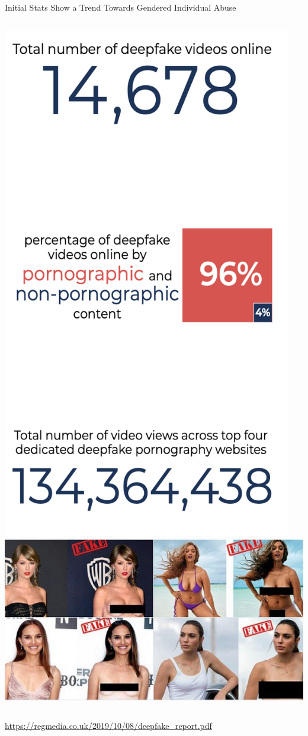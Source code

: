 \documentclass[nobackground,dvipsnames,table,aspectratio=169]{beamer}
\begin{document}
\begin{frame}{Initial Stats Show a Trend Towards Gendered Individual Abuse}
    \begin{columns}
            \includegraphics[width=0.95\textwidth]{deepfake-stats}
            \includegraphics[width=\textwidth]{deepfake-abuse}
    \end{columns}
    \small
    \underline{\url{https://regmedia.co.uk/2019/10/08/deepfake_report.pdf}}
\end{frame}
\end{document}
